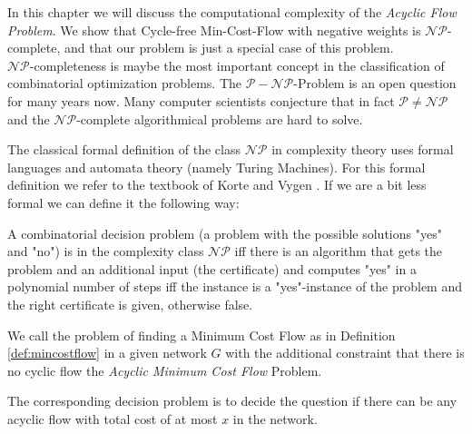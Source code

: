 In this chapter we will discuss the computational complexity of the \textit{Acyclic Flow Problem}. We show that 
Cycle-free Min-Cost-Flow with negative weights is $\mathcal{NP}$-complete, and that our problem is just a special case 
of this problem. \\

$\mathcal{NP}$-completeness is maybe the most important concept in the classification of combinatorial optimization 
problems. The $\mathcal{P-NP}$-Problem is an open question for many years now. Many computer scientists conjecture that 
in fact $\mathcal{P}\neq \mathcal{NP}$ and the $\mathcal{NP}$-complete algorithmical problems are hard to solve. 

The classical formal definition of the class $\mathcal{NP}$ in complexity theory uses formal languages and automata 
theory (namely Turing Machines). For this formal definition we refer to the textbook of Korte and Vygen 
\cite{KorteVygenCombOpt2007}. If we are a bit less formal we can define it the following way:
\begin{definition}


A combinatorial decision problem (a problem with the possible solutions "yes" and "no") is in the complexity class 
$\mathcal{NP}$ iff there is an algorithm that gets the problem and an additional input (the certificate) and computes 
"yes" in a polynomial number of steps iff the instance is a "yes"-instance of the problem and the right certificate is 
given, otherwise false.
\end{definition}





\begin{definition}
 We call the problem of finding a Minimum Cost Flow as in Definition \ref{def:mincostflow} in a given 
network $G$ with the additional constraint  that there is no cyclic flow the \textit{Acyclic Minimum Cost Flow} 
Problem. 

The corresponding decision problem is to decide the question if there can be any acyclic flow with total cost of at 
most $x$ in the network.%
\end{definition}

